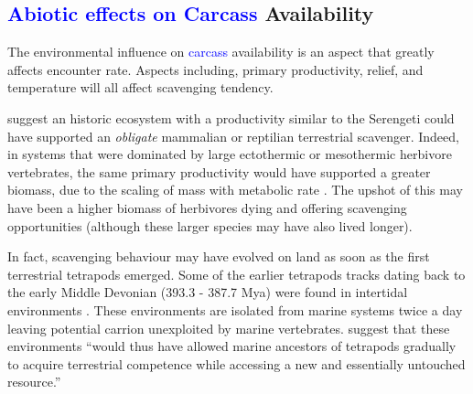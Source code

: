 \documentclass[a4paper,12pt]{article}
\begin{document}
\subsection{\textcolor{blue}{Abiotic effects on Carcass} Availability}
The environmental influence on \textcolor{blue}{carcass} availability is an aspect that greatly affects encounter rate. %
Aspects including, primary productivity, relief, and temperature will all affect scavenging tendency. 

\cite{ruxton2004obligate} suggest an historic ecosystem with a productivity similar to the Serengeti could have supported an \textit{obligate} mammalian or reptilian terrestrial scavenger.
Indeed, in systems that were dominated by large ectothermic or mesothermic herbivore vertebrates, the same primary productivity would have supported a greater biomass, due to the scaling of mass with metabolic rate \citep{mcnab2009resources}.
The upshot of this may have been a higher biomass of herbivores dying and offering scavenging opportunities (although these larger species may have also lived longer).

In fact, scavenging behaviour may have evolved on land as soon as the first terrestrial tetrapods emerged.
Some of the earlier tetrapods tracks dating back to the early Middle Devonian (393.3 - 387.7 Mya) were found in intertidal environments \citep{Niedzwiedzki2009}.
These environments are isolated from marine systems twice a day leaving potential carrion unexploited by marine vertebrates.
\cite{Niedzwiedzki2009} suggest that these environments ``would thus have allowed marine ancestors of tetrapods gradually to acquire terrestrial competence while accessing a new and essentially untouched resource.''
\end{document}
